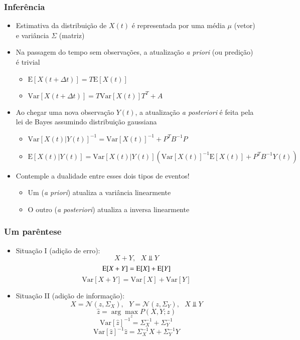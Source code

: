 \documentclass{beamer}
\begin{document}
\begin{frame}\frametitle{Inferência}
\begin{itemize}
	\item Estimativa da distribuição de $X(t)$ é representada por uma média $\mu$ (vetor) e variância $\Sigma$ (matriz)
	\item Na passagem do tempo sem observações, a atualização \textit{a priori} (ou predição) é trivial
	\begin{itemize}
		\item $\text{E}[X(t+\Delta t)] = T\text{E}[X(t)]$
		\item $\text{Var}[X(t+\Delta t)] = T\text{Var}[X(t)]T^T + A$
	\end{itemize}
	\item Ao chegar uma nova observação $Y(t)$, a atualização \textit{a posteriori} é feita pela lei de Bayes assumindo distribuição gaussiana
	\begin{itemize}
		\item $\text{Var}[X(t)|Y(t)]^{-1} = \text{Var}[X(t)]^{-1} + P^TB^{-1}P$
		\item $\text{E}[X(t)|Y(t)] = \text{Var}[X(t)|Y(t)]\left(\text{Var}[X(t)]^{-1}\text{E}[X(t)] + P^TB^{-1}Y(t)\right)$
	\end{itemize}
	\item \pause  Contemple a dualidade entre esses dois tipos de eventos!
	\begin{itemize}
		\item Um (\textit{a priori}) atualiza a variância linearmente
		\item O outro (\textit{a posteriori}) atualiza a inversa linearmente
	\end{itemize}
\end{itemize}
\end{frame}

\begin{frame}\frametitle{Um parêntese}
\begin{itemize}
	\item \pause  Situação I (adição de erro):
	$$X + Y, \text{ } X \Perp Y$$
	$$\text E[X + Y] = \text E[X] + \text E[Y]$$
	$$\text{Var}[X + Y] = \text{Var}[X] + \text{Var}[Y]$$
	\item \pause  Situação II (adição de informação):
	$$X = \mathcal N(z, \Sigma_X), \text{ } Y = \mathcal N(z, \Sigma_Y), \text{ } X \Perp Y$$
	$$\widehat z = \arg\max_z P(X, Y; z)$$
	$$\text{Var}[\widehat z]^{-1} = \Sigma_X^{-1} + \Sigma_Y^{-1} $$
	$$\text{Var}[\widehat z]^{-1} \widehat z = \Sigma_X^{-1}X + \Sigma_Y^{-1}Y $$
\end{itemize}
\end{frame}
\end{document}
